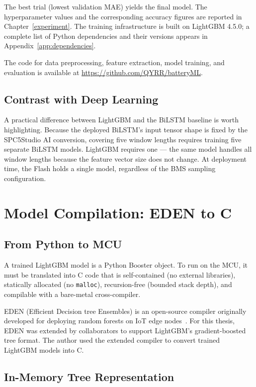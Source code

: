The best trial (lowest validation MAE) yields the final model. The hyperparameter values and the corresponding accuracy figures are reported in Chapter~\ref{experiment}. The training infrastructure is built on LightGBM 4.5.0; a complete list of Python dependencies and their versions appears in Appendix~\ref{app:dependencies}.

The code for data preprocessing, feature extraction, model training, and evaluation is available at \url{https://github.com/QYRR/batteryML}.



\subsection{Contrast with Deep Learning}

A practical difference between LightGBM and the BiLSTM baseline is worth highlighting. Because the deployed BiLSTM's input tensor shape is fixed by the SPC5Studio AI conversion, covering five window lengths requires training five separate BiLSTM models. LightGBM requires one --- the same model handles all window lengths because the feature vector size does not change. At deployment time, the Flash holds a single model, regardless of the BMS sampling configuration.


\section{Model Compilation: EDEN to C}
\label{sec:ch3_compilation}

\subsection{From Python to MCU}

A trained LightGBM model is a Python Booster object. To run on the MCU, it must be translated into C code that is self-contained (no external libraries), statically allocated (no \texttt{malloc}), recursion-free (bounded stack depth), and compilable with a bare-metal cross-compiler.

EDEN (Efficient Decision tree Ensembles) is an open-source compiler originally developed for deploying random forests on IoT edge nodes~\autocite{Eden}. For this thesis, EDEN was extended by collaborators to support LightGBM's gradient-boosted tree format. The author used the extended compiler to convert trained LightGBM models into C.

\subsection{In-Memory Tree Representation}


